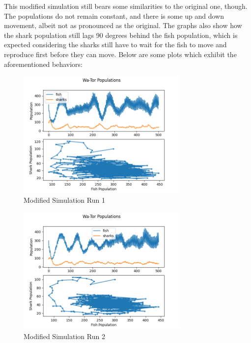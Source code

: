 \documentclass[12pt]{iopart} %
\begin{document}
This modified simulation still bears some similarities to the original one, though. 
The populations do not remain constant, and there is some up and down movement, albeit not as pronounced as the original. 
The graphs also show how the shark population still lags 90 degrees behind the fish population, which is expected considering the sharks still have to wait for the fish to move and reproduce first before they can move. 
Below are some plots which exhibit the aforementioned behaviors:


\begin{figure}[htbp]
  \begin{center}
  \item[]\includegraphics[width=0.75\textwidth]{run4plots.png}
  \end{center}
  \caption{\label{fig:run4plots}
  Modified Simulation Run 1
  }
\end{figure}

\begin{figure}[htbp]
  \begin{center}
  \item[]\includegraphics[width=0.75\textwidth]{run5plots.png}
  \end{center}
  \caption{\label{fig:run5plots}
  Modified Simulation Run 2
  }
\end{figure}
\end{document}
